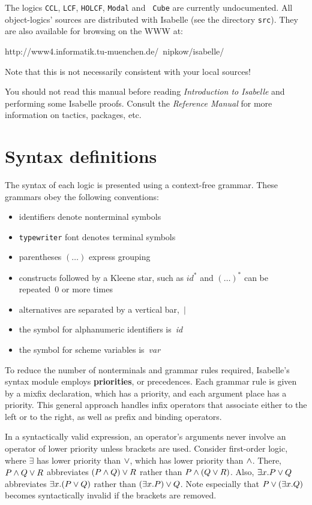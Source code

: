 The logics {\tt CCL}, {\tt LCF}, {\tt HOLCF}, {\tt Modal} and {\tt
  Cube} are currently undocumented.  All object-logics' sources are
distributed with Isabelle (see the directory \texttt{src}).  They are
also available for browsing on the WWW at:
\begin{ttbox}
http://www4.informatik.tu-muenchen.de/~nipkow/isabelle/
\end{ttbox}
Note that this is not necessarily consistent with your local sources!

\medskip You should not read this manual before reading {\em
  Introduction to Isabelle\/} and performing some Isabelle proofs.
Consult the {\em Reference Manual} for more information on tactics,
packages, etc.


\section{Syntax definitions}
The syntax of each logic is presented using a context-free grammar.
These grammars obey the following conventions:
\begin{itemize}
\item identifiers denote nonterminal symbols
\item {\tt typewriter} font denotes terminal symbols
\item parentheses $(\ldots)$ express grouping
\item constructs followed by a Kleene star, such as $id^*$ and $(\ldots)^*$
can be repeated~0 or more times 
\item alternatives are separated by a vertical bar,~$|$
\item the symbol for alphanumeric identifiers is~{\it id\/} 
\item the symbol for scheme variables is~{\it var}
\end{itemize}
To reduce the number of nonterminals and grammar rules required, Isabelle's
syntax module employs {\bf priorities}, or precedences.
Each grammar rule is given by a mixfix declaration, which has a priority,
and each argument place has a priority.  This general approach handles
infix operators that associate either to the left or to the right, as well
as prefix and binding operators.

In a syntactically valid expression, an operator's arguments never involve
an operator of lower priority unless brackets are used.  Consider
first-order logic, where $\exists$ has lower priority than $\vee$,
which has lower priority than $\wedge$.  There, $P\wedge Q \vee R$
abbreviates $(P\wedge Q) \vee R$ rather than $P\wedge (Q\vee R)$.  Also,
$\exists x.P\vee Q$ abbreviates $\exists x.(P\vee Q)$ rather than
$(\exists x.P)\vee Q$.  Note especially that $P\vee(\exists x.Q)$
becomes syntactically invalid if the brackets are removed.

